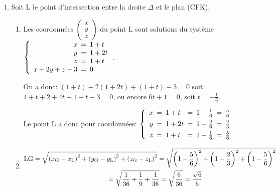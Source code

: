 \documentclass[10pt]{article}
\providecommand{\R}{\mathbb{R}}
\providecommand{\vect}[1]{\overrightarrow{#1}}
\providecommand{\vectt}[1]{\overrightarrow{\mathrm{#1}}}
\providecommand{\ds}{\displaystyle}
\begin{document}
\begin{enumerate}
$\vectt{GM}=t\cdot\vect{n}
\iff
\left \{
\begin{array}{l !{=} l}
x-1 & t\times 1\\
y-1 & t\times 2\\
z-1 & t\times 1
\end{array}
\right .
\iff
\left \{
\begin{array}{l !{=} l}
x & 1+t\\
y & 1+2t\\
z & 1+t
\end{array}
\right .$

Donc la droite $\Delta$ a pour représentation paramétrique:
$\left\{\begin{array}{l !{=} l}
x&1 + t\\
y&1 + 2t\\
z&1 + t
\end{array}
\right. \quad  (t \in \R)$.

\item Soit L le point d'intersection entre la droite $\Delta$ et le plan (CFK).
	\begin{enumerate}
		\item Les coordonnées
$\begin{pmatrix}
x \\ y \\ z
\end{pmatrix}$
du point L sont solutions du système
$\left \{
\begin{array}{r !{=} l}
x&1 + t\\
y & 1 + 2t\\
z & 1 + t\\
x+2y+z-3 & 0
\end{array}
\right .$.

On a donc: $(1+t)+2(1+2t) +(1+t)-3=0$ soit $1+t+2+4t+1+t-3=0$, ou encore $6t+1=0$, soit $t=-\frac{1}{6}$.

Le point L a donc pour coordonnées:
$\left \{
\begin{array}{r !{=} l !{=} l !{=} l}
x&1 + t & 1 -\frac{1}{6} & \frac{5}{6}\\[4pt]
y&1 + 2t & 1 - \frac{2}{6} & \frac{2}{3}\\[4pt]
z&1 + t & 1 -\frac{1}{6} & \frac{5}{6}
\end{array}
\right .$

		\item 
$\begin{gathered}\text{LG}
= \ds\sqrt{\left (x_{\text G} - x_{\text L}\right )^2 + \left (y_{\text G} - y_{\text L}\right )^2 + \left (z_{\text G} - z_{\text L}\right )^2}
= \ds\sqrt{\left (1 -\frac{5}{6}\right )^2 + \left (1-\frac{2}{3}\right )^2 + \left (1-\frac{5}{6}\right )^2}\\
\phantom{\text{LG}}
=\ds\sqrt{\frac{1}{36} + \frac{1}{9} + \frac{1}{36}}
= \ds\sqrt{\frac{6}{36}}
= \frac{\sqrt{6}}{6}
\end{gathered}$


\end{enumerate}
\end{enumerate}
\end{document}
